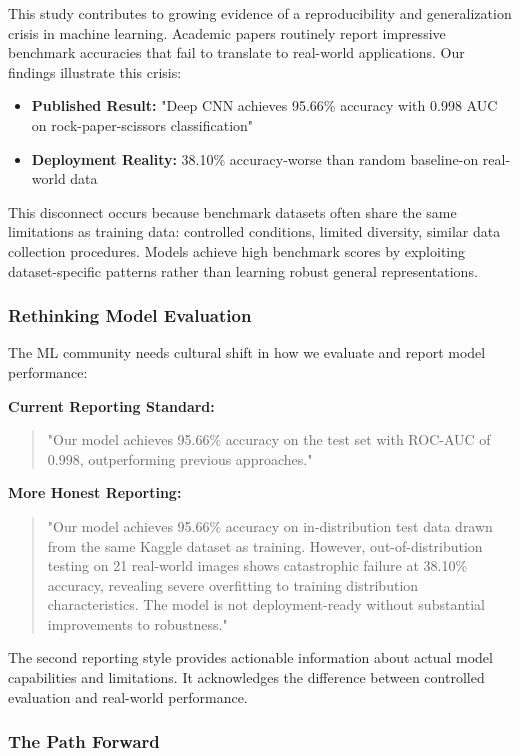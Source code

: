 \documentclass[12pt,a4paper]{article}
\begin{document}
This study contributes to growing evidence of a reproducibility and generalization crisis in machine learning. Academic papers routinely report impressive benchmark accuracies that fail to translate to real-world applications. Our findings illustrate this crisis:

\begin{itemize}
    \item \textbf{Published Result:} "Deep CNN achieves 95.66\% accuracy with 0.998 AUC on rock-paper-scissors classification"
    \item \textbf{Deployment Reality:} 38.10\% accuracy-worse than random baseline-on real-world data
\end{itemize}

This disconnect occurs because benchmark datasets often share the same limitations as training data: controlled conditions, limited diversity, similar data collection procedures. Models achieve high benchmark scores by exploiting dataset-specific patterns rather than learning robust general representations.

\subsubsection{Rethinking Model Evaluation}

The ML community needs cultural shift in how we evaluate and report model performance:

\textbf{Current Reporting Standard:}
\begin{quotation}
"Our model achieves 95.66\% accuracy on the test set with ROC-AUC of 0.998, outperforming previous approaches."
\end{quotation}

\textbf{More Honest Reporting:}
\begin{quotation}
"Our model achieves 95.66\% accuracy on in-distribution test data drawn from the same Kaggle dataset as training. However, out-of-distribution testing on 21 real-world images shows catastrophic failure at 38.10\% accuracy, revealing severe overfitting to training distribution characteristics. The model is not deployment-ready without substantial improvements to robustness."
\end{quotation}

The second reporting style provides actionable information about actual model capabilities and limitations. It acknowledges the difference between controlled evaluation and real-world performance.

\subsubsection{The Path Forward}
\end{document}
